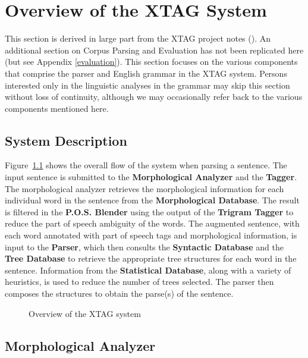 \chapter{Overview of the XTAG System}
\label{overview}

This section is derived in large part from the XTAG project notes
(\cite{Xtag-notes}).  An additional section on Corpus Parsing and Evaluation
has not been replicated here (but see Appendix \ref{evaluation}). This section
focuses on the various components that comprise the parser and English grammar
in the XTAG system.  Persons interested only in the linguistic analyses in the
grammar may skip this section without loss of continuity, although we may
occasionally refer back to the various components mentioned here.

\section{System Description}

Figure~{\ref{flowchart}} shows the overall flow of the system when parsing a
sentence. The input sentence is submitted to the {\bf Morphological Analyzer}
and the {\bf Tagger}. The morphological analyzer retrieves the morphological
information for each individual word in the sentence from the {\bf
Morphological Database}. The result is filtered in the {\bf P.O.S. Blender}
using the output of the {\bf Trigram Tagger} to reduce the part of speech
ambiguity of the words. The augmented sentence, with each word annotated with
part of speech tags and morphological information, is input to the {\bf
Parser}, which then consults the {\bf Syntactic Database} and the {\bf Tree
Database} to retrieve the appropriate tree structures for each word in the
sentence.  Information from the {\bf Statistical Database}, along with a
variety of heuristics, is used to reduce the number of trees selected. The
parser then composes the structures to obtain the parse(s) of the sentence.

\begin{figure}[htb]
\centering
\mbox{}
{}
\caption{Overview of the XTAG system}
\label{flowchart}
\end{figure}

\section{Morphological Analyzer}

